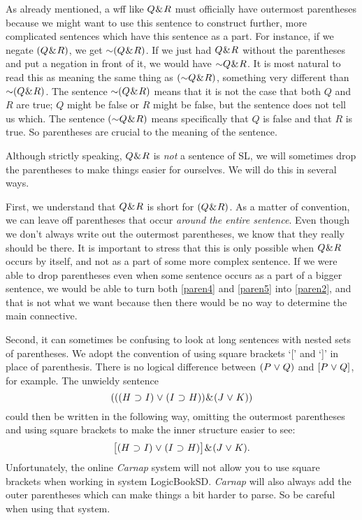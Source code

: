 As already mentioned, a wff like $Q \mkern1mu\&\mkern1mu R$ must officially have outermost parentheses because we might want to use this sentence to construct further, more complicated sentences which have this sentence as a part. 
For instance, if we negate $(Q \mkern1mu\&\mkern1mu R)$, we get $\enot(Q \eand R)$.
If we just had $Q \mkern1mu\&\mkern1mu R$ without the parentheses and put a negation in front of it, we would have $\enot Q \eand R$.
It is most natural to read this as meaning the same thing as $(\enot Q \eand R)$, something very different than $\enot(Q\eand R)$.
The sentence $\enot(Q \eand R)$ means that it is not the case that both $Q$ and $R$ are true; $Q$ might be false or $R$ might be false, but the sentence does not tell us which.
The sentence $(\enot Q \eand R)$ means specifically that $Q$ is false and that $R$ is true.
So parentheses are crucial to the meaning of the sentence.

Although strictly speaking, $Q \mkern1mu\&\mkern1mu R$ is \emph{not} a sentence of SL, we will sometimes drop the parentheses to make things easier for ourselves.
We will do this in several ways.

First, we understand that $Q \mkern1mu\&\mkern1mu R$ is short for $(Q \mkern1mu\&\mkern1mu R)$.
As a matter of convention, we can leave off parentheses that occur \emph{around the entire sentence}.
Even though we don't always write out the outermost parentheses, we know that they really should be there.
It is important to stress that this is only possible when $Q \mkern1mu\&\mkern1mu R$ occurs by itself, and not as a part of some more complex sentence. 
If we were able to drop parentheses even when some sentence occurs as a part of a bigger sentence, we would be able to turn both \ref{paren4} and \ref{paren5} into \ref{paren2}, and that is not what we want because then there would be no way to determine the main connective.

Second, it can sometimes be confusing to look at long sentences with nested sets of parentheses.
We adopt the convention of using square brackets `[' and `]' in place of parenthesis.
There is no logical difference between $(P\mkern1mu\vee\mkern1mu Q)$ and $[P\mkern1mu\vee\mkern1mu Q]$, for example.
The unwieldy sentence
  $$(((H \mkern1mu\supset\mkern1mu I) \mkern1mu\vee\mkern1mu (I \mkern1mu\supset\mkern1mu H)) \mkern1mu\&\mkern1mu (J \mkern1mu\vee\mkern1mu K))$$
could then be written in the following way, omitting the outermost parentheses and using square brackets to make the inner structure easier to see:
  $$\bigl[(H \mkern1mu\supset\mkern1mu I) \mkern1mu\vee\mkern1mu (I \mkern1mu\supset\mkern1mu H)\bigr] \mkern1mu\&\mkern1mu (J \mkern1mu\vee\mkern1mu K).$$
Unfortunately, the online \textit{Carnap} system will not allow you to use square brackets when working in system LogicBookSD.
\textit{Carnap} will also always add the outer parentheses which can make things a bit harder to parse.
So be careful when using that system.

